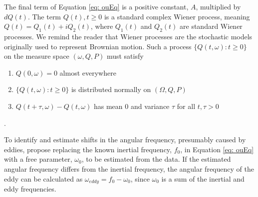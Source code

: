 \documentclass{stat572Style}
\begin{document}
 The final term of Equation \eqref{eq: ouEq} is a positive constant, $A$, multiplied by $dQ(t)$.  The term $Q(t), t \geq 0$ is a standard complex Wiener process,  meaning $Q(t) = Q_{1}(t) + i Q_{2}(t)$, where $Q_{1}(t)$ and $Q_{2}(t)$ are standard Wiener processes.
 We remind the reader that Wiener processes are the stochastic models originally used to represent Brownian motion. 
  Such a process $\{Q(t, \omega): t \geq 0\}$ on the measure space $(\omega, Q, P)$ must satisfy
\begin{enumerate}
\item $Q(0, \omega) = 0$ almost everywhere
\item $\{Q(t, \omega): t \geq 0\}$ is distributed normally on $(\Omega,Q, P)$
\item $Q(t + \tau, \omega) - Q(t, \omega)$ has mean 0 and variance $\tau$ for all $t, \tau > 0$
\end{enumerate}
\citep{Hida1980}. 

To identify and estimate shifts in the angular frequency, presumably caused by eddies, \citet{Sykulski2016} propose replacing the known inertial frequency, $f_{0}$,  in Equation \eqref{eq: ouEq} with  a free parameter, $\omega_{0}$, to be estimated  from the data. 
If the estimated angular frequency differs from the inertial frequency, the angular frequency of the eddy can be calculated as $\omega_{eddy} = f_{0} - \omega_{0}$, since $\omega_{0}$ is a sum of the inertial and eddy frequencies.
\end{document}
